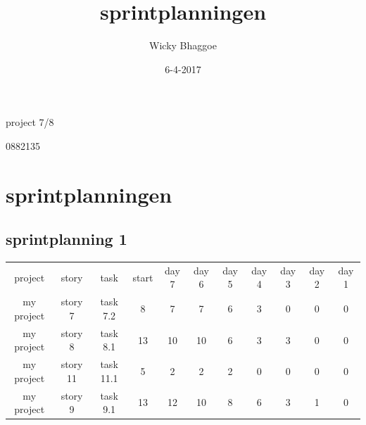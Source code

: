 \documentclass[12pt, a4paper]{extarticle}
\title{sprintplanningen}
\date{6-4-2017}
\author{Wicky Bhaggoe}
\begin{document}
	\nocite{*}
	\maketitle
	project 7/8
	
	0882135
	
	\newpage
	\tableofcontents
	
	\newpage
	\section{sprintplanningen}
	\subsection{sprintplanning 1}
	\begin{center}
		\begin{tabular}{ |c|c|c|c|c|c|c|c|c|c|c| } 
			\hline
			project & story & task & start & day 7 & day 6 & day 5 & day 4& day 3 & day 2 & day 1 \\ 
			my project & story 7 & task 7.2 & 8 & 7 & 7 & 6 & 3 & 0 & 0 & 0 \\
			my project & story 8 & task 8.1 & 13  & 10 & 10 & 6 & 3 & 3 & 0 & 0 \\
			my project & story 11 & task 11.1 & 5 & 2 & 2 & 2 & 0 & 0 & 0 & 0 \\
			my project & story 9 & task 9.1 & 13 & 12 & 10 & 8 & 6 & 3 & 1 & 0 \\
			\hline
		\end{tabular}
	\end{center}
\end{document}
